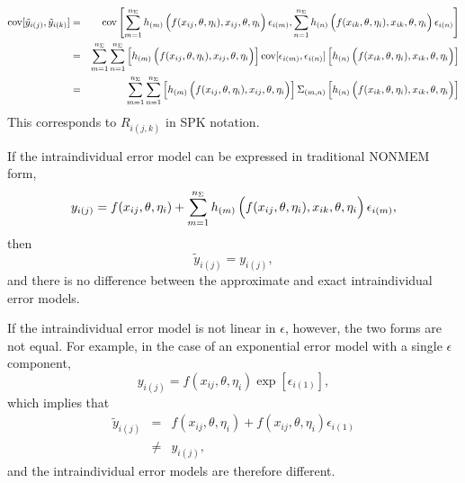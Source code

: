 \documentclass{article}
\begin{document}
  \begin{eqnarray}
    \mbox{cov} [ \tilde{y}_{i(j)} , \tilde{y}_{i(k)} ]
    & = &  \mbox{cov} \left[
      \sum_{m=1}^{n_{\Sigma}} h_{(m)}\left( \rule{0.0in}{0.15in} 
        f(x_{ij}, \theta, \eta_i), x_{ij}, \theta, \eta_i \right) \epsilon_{i(m)},
      \sum_{n=1}^{n_{\Sigma}} h_{(n)}\left( \rule{0.0in}{0.15in} 
        f(x_{ik}, \theta, \eta_i), x_{ik}, \theta, \eta_i \right) \epsilon_{i(n)}
      \right] \\
    & = & \sum_{m=1}^{n_{\Sigma}} \sum_{n=1}^{n_{\Sigma}} \left[
      h_{(m)}\left( \rule{0.0in}{0.15in} f(x_{ij}, \theta, \eta_i),
        x_{ij}, \theta, \eta_i \right) 
      \right]
      \mbox{cov} [ \epsilon_{i(m)} , \epsilon_{i(n)} ]
      \left[
      h_{(n)}\left( \rule{0.0in}{0.15in} f(x_{ik}, \theta, \eta_i), 
        x_{ik}, \theta, \eta_i \right)
      \right]
    \\
    & = & \sum_{m=1}^{n_{\Sigma}} \sum_{n=1}^{n_{\Sigma}} \left[
      h_{(m)}\left( \rule{0.0in}{0.15in} f(x_{ij}, \theta, \eta_i),
        x_{ij}, \theta, \eta_i \right) 
      \right]
      \Sigma_{(m,n)}
      \left[
      h_{(n)}\left( \rule{0.0in}{0.15in} f(x_{ik}, \theta, \eta_i),
        x_{ik}, \theta, \eta_i \right)
     \right]
  \end{eqnarray}
This corresponds to $R_{i(j,k)}$ in SPK notation.

If the intraindividual error model can be expressed in traditional
NONMEM form, 
  \begin{equation}
    y_{i(j)} = f(x_{ij}, \theta, \eta_i) 
      + \sum_{m=1}^{n_{\Sigma}}
      h_{(m)}\left( \rule{0.0in}{0.15in} f(x_{ij}, \theta, \eta_i), 
        x_{ik}, \theta, \eta_i \right) \epsilon_{i(m)} ,
  \end{equation}
then 
  \begin{equation}
    \widetilde{y}_{i(j)} = y_{i(j)} ,
  \end{equation}
and there is no difference between the approximate and exact
intraindividual error models.

If the intraindividual error model is not linear
in $\epsilon$, however, the two forms are not equal.
For example, in the case of an exponential error model with a single 
$\epsilon$ component, 
  \begin{equation}
    y_{i(j)} = f(x_{ij}, \theta, \eta_i) \exp[ \epsilon_{i(1)} ] ,
  \end{equation}
which implies that
  \begin{eqnarray}
    \widetilde{y}_{i(j)} 
      & = & f(x_{ij}, \theta, \eta_i) 
        + f(x_{ij}, \theta, \eta_i) \epsilon_{i(1)} \\
      & \neq & y_{i(j)} ,
  \end{eqnarray}
and the intraindividual error models are therefore different.
\end{document}
